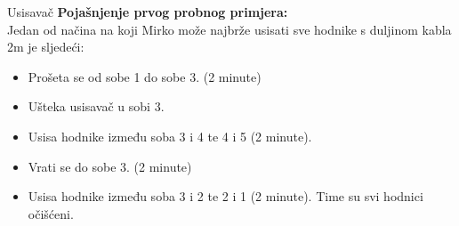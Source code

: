 \begin{statement}[
  problempoints=100,
  timelimit=1 sekunda,
  memorylimit=512 MiB,
]{Usisavač}
\textbf{Pojašnjenje prvog probnog primjera:}\\

Jedan od načina na koji Mirko može najbrže usisati sve hodnike s duljinom kabla 2m je sljedeći:
\begin{itemize}
	\item Prošeta se od sobe 1 do sobe 3. (2 minute)
	\item Ušteka usisavač u sobi 3.
	\item Usisa hodnike između soba 3 i 4 te 4 i 5 (2 minute).
	\item Vrati se do sobe 3. (2 minute)
	\item Usisa hodnike između soba 3 i 2 te 2 i 1 (2 minute). Time su svi hodnici očišćeni.
\end{itemize}

\end{statement}

